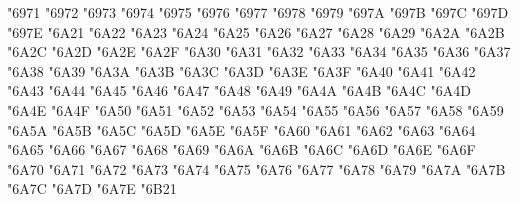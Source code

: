 {\Uchar\jis"6971 %
\Uchar\jis"6972 %
\Uchar\jis"6973 %
\Uchar\jis"6974 %
\Uchar\jis"6975 %
\Uchar\jis"6976 %
\Uchar\jis"6977 %
\Uchar\jis"6978 %
\Uchar\jis"6979 %
\Uchar\jis"697A %
\Uchar\jis"697B %
\Uchar\jis"697C %
\Uchar\jis"697D %
\Uchar\jis"697E %
\Uchar\jis"6A21 %
\Uchar\jis"6A22 %
\Uchar\jis"6A23 %
\Uchar\jis"6A24 %
\Uchar\jis"6A25 %
\Uchar\jis"6A26 %
\Uchar\jis"6A27 %
\Uchar\jis"6A28 %
\Uchar\jis"6A29 %
\Uchar\jis"6A2A %
\Uchar\jis"6A2B %
\Uchar\jis"6A2C %
\Uchar\jis"6A2D %
\Uchar\jis"6A2E %
\Uchar\jis"6A2F %
\Uchar\jis"6A30 %
\Uchar\jis"6A31 %
\Uchar\jis"6A32 %
\Uchar\jis"6A33 %
\Uchar\jis"6A34 %
\Uchar\jis"6A35 %
\Uchar\jis"6A36 %
\Uchar\jis"6A37 %
\Uchar\jis"6A38 %
\Uchar\jis"6A39 %
\Uchar\jis"6A3A %
\Uchar\jis"6A3B %
\Uchar\jis"6A3C %
\Uchar\jis"6A3D %
\Uchar\jis"6A3E %
\Uchar\jis"6A3F %
\Uchar\jis"6A40 %
\Uchar\jis"6A41 %
\Uchar\jis"6A42 %
\Uchar\jis"6A43 %
\Uchar\jis"6A44 %
\Uchar\jis"6A45 %
\Uchar\jis"6A46 %
\Uchar\jis"6A47 %
\Uchar\jis"6A48 %
\Uchar\jis"6A49 %
\Uchar\jis"6A4A %
\Uchar\jis"6A4B %
\Uchar\jis"6A4C %
\Uchar\jis"6A4D %
\Uchar\jis"6A4E %
\Uchar\jis"6A4F %
\Uchar\jis"6A50 %
\Uchar\jis"6A51 %
\Uchar\jis"6A52 %
\Uchar\jis"6A53 %
\Uchar\jis"6A54 %
\Uchar\jis"6A55 %
\Uchar\jis"6A56 %
\Uchar\jis"6A57 %
\Uchar\jis"6A58 %
\Uchar\jis"6A59 %
\Uchar\jis"6A5A %
\Uchar\jis"6A5B %
\Uchar\jis"6A5C %
\Uchar\jis"6A5D %
\Uchar\jis"6A5E %
\Uchar\jis"6A5F %
\Uchar\jis"6A60 %
\Uchar\jis"6A61 %
\Uchar\jis"6A62 %
\Uchar\jis"6A63 %
\Uchar\jis"6A64 %
\Uchar\jis"6A65 %
\Uchar\jis"6A66 %
\Uchar\jis"6A67 %
\Uchar\jis"6A68 %
\Uchar\jis"6A69 %
\Uchar\jis"6A6A %
\Uchar\jis"6A6B %
\Uchar\jis"6A6C %
\Uchar\jis"6A6D %
\Uchar\jis"6A6E %
\Uchar\jis"6A6F %
\Uchar\jis"6A70 %
\Uchar\jis"6A71 %
\Uchar\jis"6A72 %
\Uchar\jis"6A73 %
\Uchar\jis"6A74 %
\Uchar\jis"6A75 %
\Uchar\jis"6A76 %
\Uchar\jis"6A77 %
\Uchar\jis"6A78 %
\Uchar\jis"6A79 %
\Uchar\jis"6A7A %
\Uchar\jis"6A7B %
\Uchar\jis"6A7C %
\Uchar\jis"6A7D %
\Uchar\jis"6A7E %
\Uchar\jis"6B21 %
}
